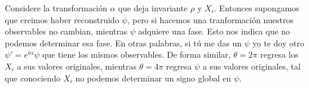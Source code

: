 \documentclass[12pt]{exam}
\begin{document}
\begin{questions}
\begin{itemize}
\vspace{1em}
{\color{RedViolet}\small
        Considere la transformación $\alpha$ que deja invariante $\rho$ y $X_i$. Entonces supongamos que creimos haber reconstruido $\psi$, pero si hacemos una tranformación nuestros observables no cambian, mientras $\psi$ adquiere una fase. Esto nos indica que no podemos determinar esa fase. En otras palabras, si tú me das un $\psi$ yo te doy otro $\psi' = e^{i\alpha}\psi$ que tiene los mismos observables. De forma similar, $\theta = 2\pi$ regresa los $X_i$ a sus valores originales, mientras $\theta = 4\pi$ regresa $\psi$ a sus valores originales, tal que conociendo $X_i$ no podemos determinar un signo global en $\psi$.
}
\end{itemize}
        

\end{questions}
\end{document}
